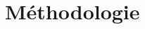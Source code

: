 
\let\textcircled=\pgftextcircled
\chapter{Méthodologie}
\label{chap:methodologie}
\setlength{\arrayrulewidth}{1pt}


\providecommand{\opmanicule}{\textcolor{darkgray}{\ding{42}}}
\providecommand{\opplume}{\textcolor{darkgray}{\ding{45}}}

\providecommand{\opstereo}[1]{$\ll$\,\textit{#1}\,$\gg$}

\providecommand{\Uni}{\mathcal{U}}
\providecommand{\Res}{\mathcal{R}}
\providecommand{\Alg}{\mathcal{A}}
\providecommand{\Tset}{\mathcal{T}}
\providecommand{\Ttypes}{\mathcal{T}_{\text{types}}}
\providecommand{\svec}{\vec{S}_{kv}}

